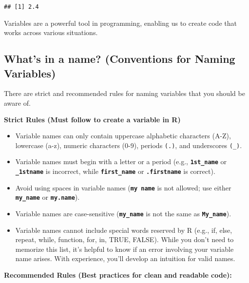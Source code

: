 \documentclass[
]{book}
\begin{document}
\begin{verbatim}
## [1] 2.4
\end{verbatim}

Variables are a powerful tool in programming, enabling us to create code that works across various situations.

\subsection{What's in a name? (Conventions for Naming Variables)}\label{whats-in-a-name-conventions-for-naming-variables}

There are strict and recommended rules for naming variables that you should be aware of.

\textbf{Strict Rules (Must follow to create a variable in R)}

\begin{itemize}
\item
  Variable names can only contain uppercase alphabetic characters (A-Z), lowercase (a-z), numeric characters (0-9), periods \texttt{(.)}, and underscores \texttt{(\_)}.
\item
  Variable names must begin with a letter or a period (e.g., \textbf{\texttt{1st\_name}} or \textbf{\texttt{\_1stname}} is incorrect, while \textbf{\texttt{first\_name}} or \textbf{\texttt{.firstname}} is correct).
\item
  Avoid using spaces in variable names (\textbf{\texttt{my\ name}} is not allowed; use either \textbf{\texttt{my\_name}} or \textbf{\texttt{my.name}}).
\item
  Variable names are case-sensitive (\textbf{\texttt{my\_name}} is not the same as \textbf{\texttt{My\_name}}).
\item
  Variable names cannot include special words reserved by R (e.g., if, else, repeat, while, function, for, in, TRUE, FALSE). While you don't need to memorize this list, it's helpful to know if an error involving your variable name arises. With experience, you'll develop an intuition for valid names.
\end{itemize}

\textbf{Recommended Rules (Best practices for clean and readable code):}
\end{document}
